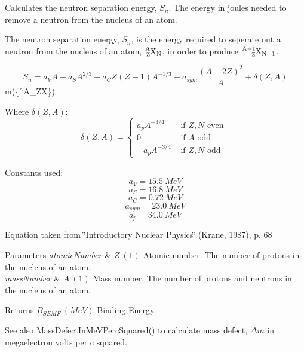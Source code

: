 Calculates the neutron separation energy, $S_{n}$. The energy in joules needed to remove a neutron from the nucleus of an atom. 

The neutron separation energy, $S_{n}$, is the energy required to seperate out a neutron from the nucleus of an atom, $\ce{ ^{A}_{Z}X_{N} }$, in order to produce $\ce{ ^{A-1}_{Z}X_{N-1} }$.

\[S_{n} = a_V A - a_S A^{2/3}-a_C Z(Z-1)A^{-1/3}-a_{sym}\frac{(A-2Z)^2}{A}+\delta(Z,A)\] m(\{$^\wedge$\+A\+\_\+\+ZX\})

Where $\delta(Z,A)$\+: \[\delta(Z,A)=\begin{cases} a_pA^{-3/4} & \text{ if } Z,N\text{ even }\\ 0 & \text{ if } A \text{ odd }\\ -a_pA^{-3/4} & \text{ if } Z,N \text{ odd } \end{cases}\]

Constants used\+: \[a_V = 15.5\ MeV\] \[a_S = 16.8\ MeV\] \[a_C = 0.72\ MeV\] \[a_{sym} = 23.0\ MeV\] \[a_p = 34.0\ MeV\]

Equation taken from \char`\"{}\+Introductory Nuclear Physics\char`\"{} (Krane, 1987), p. 68


\begin{DoxyParams}{Parameters}
{\em atomic\+Number} & $Z\ (1)$ Atomic number. The number of protons in the nucleus of an atom. \\
\hline
{\em mass\+Number} & $A\ (1)$ Mass number. The number of protons and neutrons in the nucleus of an atom. \\
\hline
\end{DoxyParams}
\begin{DoxyReturn}{Returns}
$B_{SEMF}\ (MeV)$ Binding Energy. 
\end{DoxyReturn}
\begin{DoxySeeAlso}{See also}
Mass\+Defect\+In\+Me\+V\+Perc\+Squared() to calculate mass defect, $\Delta m$ in megaelectron volts per c squared. 
\end{DoxySeeAlso}
